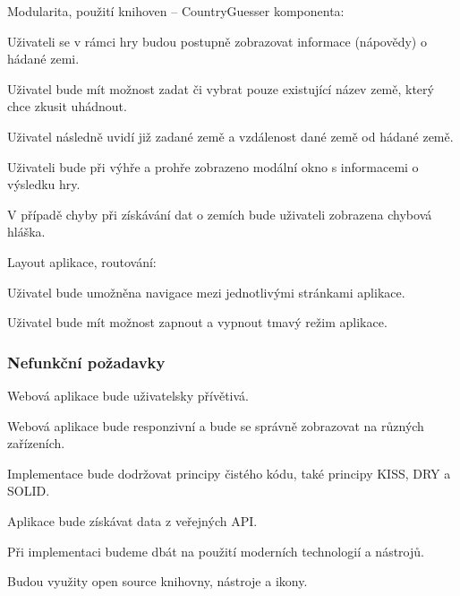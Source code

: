 \begin{citemize}
	\item Modularita, použití knihoven -- CountryGuesser komponenta:
	
	\begin{cenumerate}
		\item Uživateli se v rámci hry budou postupně zobrazovat informace (nápovědy) o hádané zemi.
		\item Uživatel bude mít možnost zadat či vybrat pouze existující název země, který chce zkusit uhádnout.
		\item Uživatel následně uvidí již zadané země a vzdálenost dané země od hádané země.
		\item Uživateli bude při výhře a prohře zobrazeno modální okno s informacemi o výsledku hry.
		\item V případě chyby při získávání dat o zemích bude uživateli zobrazena chybová hláška.
	\end{cenumerate}

	\item Layout aplikace, routování:
	
	\begin{cenumerate}
		\item Uživatel bude umožněna navigace mezi jednotlivými stránkami aplikace.
		\item Uživatel bude mít možnost zapnout a vypnout tmavý režim aplikace.
	\end{cenumerate}
\end{citemize}

\subsubsection{Nefunkční požadavky}

\begin{citemize}
	\item Webová aplikace bude uživatelsky přívětivá.
	\item Webová aplikace bude responzivní a bude se správně zobrazovat na různých zařízeních.
	\item Implementace bude dodržovat principy čistého kódu, také principy KISS, DRY a SOLID.
	\item Aplikace bude získávat data z veřejných API.
	\item Při implementaci budeme dbát na použití moderních technologií a nástrojů.
	\item Budou využity open source knihovny, nástroje a ikony. 
\end{citemize}


